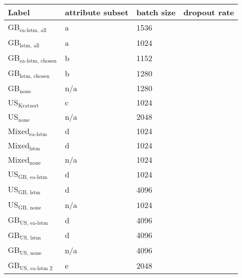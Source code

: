 \begin{tabular}{llll}
    \toprule
    Label & attribute subset & batch size & dropout rate\\
    \midrule
    GB$_\text{ea-lstm, all}$ & a &  1536 \\
    GB$_\text{lstm, all}$ & a & 1024 \\
    GB$_\text{ea-lstm, chosen}$ & b & 1152 \\
    GB$_\text{lstm, chosen}$ & b & 1280 \\
    GB$_\text{none}$ & n/a & 1280 \\
    US$_\text{Kratzert}$  & c & 1024 \\
    US$_\text{none}$  & n/a & 2048 \\
    Mixed$_\text{ea-lstm}$ & d & 1024 \\
    Mixed$_\text{lstm}$ & d & 1024 \\
    Mixed$_\text{none}$ & n/a & 1024 \\
    US$_\text{GB, ea-lstm}$ & d  & 1024 \\
    US$_\text{GB, lstm}$ & d  & 4096 \\
    US$_\text{GB, none}$ & n/a & 1024 \\
    GB$_\text{US, ea-lstm}$ & d & 4096 \\
    GB$_\text{US, lstm}$  & d & 4096 \\ 
    GB$_\text{US, none}$  & n/a & 4096 \\
    GB$_\text{US, ea-lstm 2}$ & e & 2048 \\

\end{tabular}
